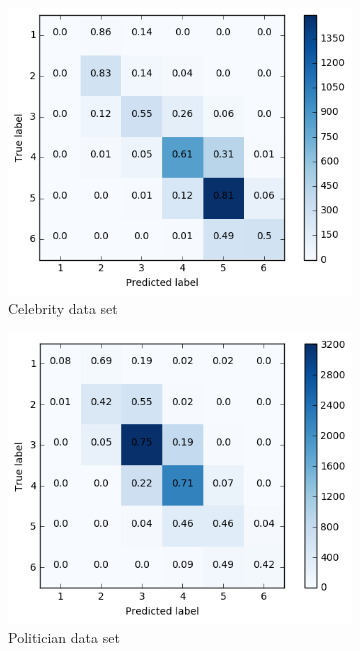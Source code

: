 \begin{figure}[h]
\begin{subfigure}{.4\textwidth}
  \includegraphics[width=.95\linewidth]{img/celeb_d2_cm_favorites}
  \caption{Celebrity data set}
  \label{fig:d2_fav_distr_sub1}
\end{subfigure}%
\begin{subfigure}{.4\textwidth}
  \includegraphics[width=.95\linewidth]{img/polit_d2_cm_favorites}
  \caption{Politician data set}
  \label{fig:d2_fav_distr_sub2}
\end{subfigure}
\begin{subfigure}{.4\textwidth}

\end{subfigure}
\end{figure}
